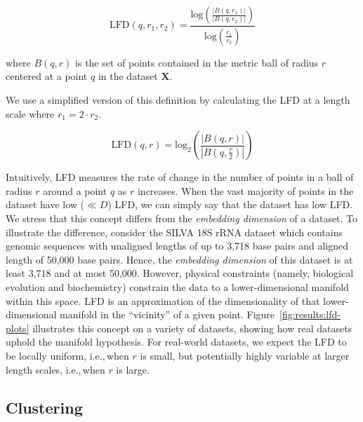 \begin{equation}
    \text{LFD}(q, r_1, r_2) = \frac{\text{log} \left( \frac{|B(q, r_1)|}{|B(q, r_2)|} \right) }{\text{log} \left( \frac{r_1}{r_2} \right) }
    \label{eq:methods:lfd-original}
\end{equation}

where $B(q, r)$ is the set of points contained in the metric ball of radius $r$ centered at a point $q$ in the dataset $\textbf{X}$.

We use a simplified version of this definition by calculating the LFD at a length scale where $r_1 = 2 \cdot r_2$.

\begin{equation}
    \text{LFD}(q, r) = \text{log}_2 \left( \frac{|B(q, r)|}{|B(q, \frac{r}{2})|} \right)
    \label{eq:methods:lfd-half}
\end{equation}

Intuitively, LFD measures the rate of change in the number of points in a ball of radius $r$ around a point $q$ as $r$ increases. When the vast majority of points in the dataset have low ($\ll D$) LFD, we can simply say that the dataset has low LFD.
We stress that this concept differs from the \textit{embedding dimension} of a dataset.
To illustrate the difference, consider the SILVA 18S rRNA dataset which contains genomic sequences with unaligned lengths of up to 3,718 base pairs and aligned length of 50,000 base pairs.
Hence, the \textit{embedding dimension} of this dataset is at least 3,718 and at most 50,000.
However, physical constraints (namely, biological evolution and biochemistry) constrain the data to a lower-dimensional manifold within this space.
LFD is an approximation of the dimensionality of that lower-dimensional manifold in the ``vicinity'' of a given point.
Figure~\ref{fig:results:lfd-plots} illustrates this concept on a variety of datasets, showing how real datasets uphold the manifold hypothesis.
For real-world datasets, we expect the LFD to be locally uniform, i.e.,\,when $r$ is small, but potentially highly variable at larger length scales, i.e.,\,when $r$ is large.


\subsection{Clustering}
\label{sec:methods:clustering}

